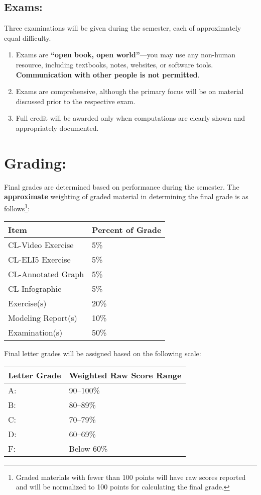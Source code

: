 \documentclass[12pt]{article}
\begin{document}
\subsection*{Exams:}
Three examinations will be given during the semester, each of approximately equal difficulty.
\begin{enumerate}
    \item Exams are \textbf{“open book, open world”}—you may use any non-human resource, including textbooks, notes, websites, or software tools. \textbf{Communication with other people is not permitted}.
    \item Exams are comprehensive, although the primary focus will be on material discussed prior to the respective exam.
    \item Full credit will be awarded only when computations are clearly shown and appropriately documented.
\end{enumerate}

\clearpage
\section*{Grading:} Final grades are determined based on performance during the semester.  The \textbf{approximate} weighting of graded material in determining the final grade is as follows\footnote{Graded materials with fewer than 100 points will have raw scores reported and will be normalized to 100 points for calculating the final grade.}:
\begin{table}[h!]
   \centering
   \begin{tabular}{l l}
Item & Percent of Grade \\
\hline
\hline
CL-Video Exercise & 5\% \\
CL-ELI5 Exercise & 5\% \\
CL-Annotated Graph & 5\% \\
CL-Infographic & 5\% \\
Exercise(s) & 20\% \\
Modeling Report(s) & 10\% \\
Examination(s) & 50\% \\
\hline
\end{tabular}
\end{table}

Final letter grades will be assigned based on the following scale:

\begin{table}[h!]
   \centering
   \begin{tabular}{l l}
Letter Grade & Weighted Raw Score Range \\
\hline
\hline
A:& 90--100\%\\
B:& 80--89\%\\
C:& 70--79\%\\
D:& 60--69\%\\
F:& Below 60\%\\
\hline
\end{tabular}
\end{table}
\end{document}

